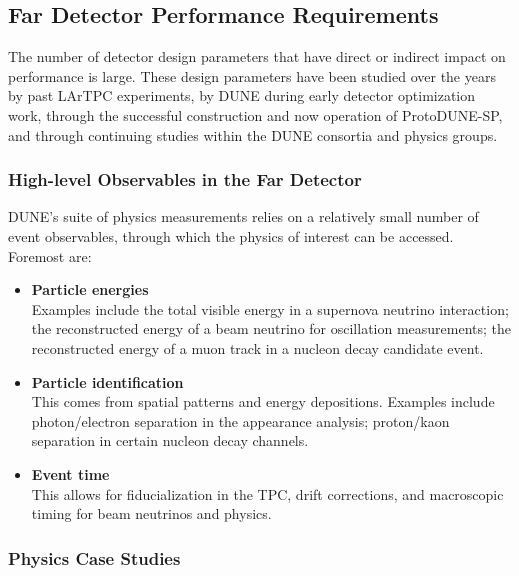 \subsection{Far Detector Performance Requirements}
\label{sec:exec-summ-fd-requirements}


The number of detector design parameters that have direct
or indirect impact on performance is large.  These design
parameters have been studied over the years by past LArTPC
experiments, by DUNE during early detector optimization work,
through the successful construction and now operation of
ProtoDUNE-SP, and through continuing studies within the
DUNE consortia and physics groups.

\subsubsection{High-level Observables in the Far Detector}

DUNE's suite of physics measurements relies on a relatively small
number of event observables, through which the physics of interest
can be accessed.  Foremost are:
%                                                                                                
\begin{itemize}
\item {\bf Particle energies}  \\
Examples include the total visible energy in a supernova
neutrino interaction; the reconstructed energy of a beam
neutrino for oscillation measurements; the reconstructed
energy of a muon track in a nucleon decay candidate event.

\item {\bf Particle identification}  \\
This comes from spatial patterns and energy depositions.
Examples include photon/electron separation in the \nue{}
appearance analysis; proton/kaon separation in certain
nucleon decay channels.

\item {\bf Event time} \\
This allows for fiducialization
in the TPC, drift corrections, and macroscopic timing for
beam neutrinos and  physics.
\end{itemize}



\subsubsection{Physics Case Studies}

